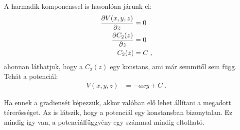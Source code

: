  A harmadik komponenssel is hasonlóan járunk el:
 \begin{align}
  \frac{\partial V(x,y,z)}{\partial z}&=0 \\
  \frac{\partial C_2(z)}{\partial z}&=0 \\
  C_2(z)&=C\label{eq:z}\;,
 \end{align}
 ahonnan láthatjuk, hogy a $C_2(z)$ egy konstans, ami már semmitől sem függ. Tehát a potenciál:
 \begin{align}
  V(x,y,z)&=-axy + C\;.
 \end{align}
 
 Ha ennek a gradiensét képezzük, akkor valóban elő lehet állítani a megadott térerősséget. Az is látszik, hogy a potenciál egy konstansban bizonytalan. Ez mindig így van, a potenciálfüggvény egy számmal mindig eltolható.

\fi